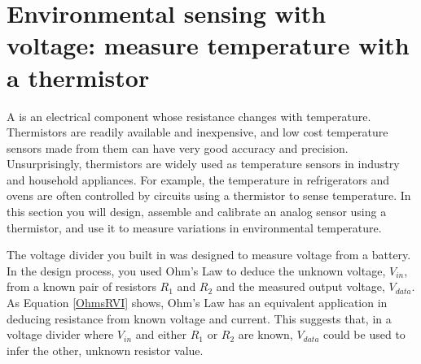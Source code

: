 %

\section{Environmental sensing with voltage: measure temperature with a thermistor}
A  is an electrical component whose resistance changes with temperature.
Thermistors are readily available and inexpensive, and low cost temperature sensors made from them can have very good accuracy and precision.
Unsurprisingly, thermistors are widely used as temperature sensors in industry and household appliances. 
For example, the temperature in refrigerators and ovens are often controlled by circuits using a thermistor to sense temperature.
In this section you will design, assemble and calibrate an analog sensor using a thermistor, and use it to measure variations in environmental temperature.

The voltage divider you built in  was designed to measure voltage from a battery. %
In the design process, you used Ohm's Law to deduce the unknown voltage, $V_{in}$, from a known pair of resistors $R_1$ and $R_2$ and the measured output voltage, $V_{data}$.
As Equation \ref{OhmsRVI} shows, Ohm's Law has an equivalent application in deducing resistance from known voltage and current.
This suggests that, in a voltage divider where $V_{in}$ and either $R_1$ or $R_2$ are known, $V_{data}$ could be used to infer the other, unknown resistor value.


